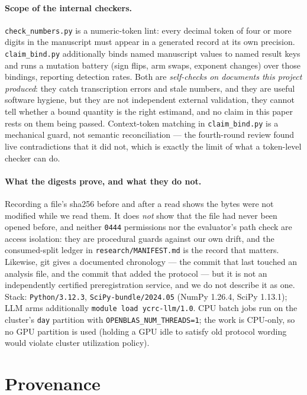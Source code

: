 \documentclass{neurips_2024}
\begin{document}
\paragraph{Scope of the internal checkers.}
\texttt{check\_numbers.py} is a numeric-token lint: every decimal token of four or more digits
in the manuscript must appear in a generated record at its own precision. \texttt{claim\_bind.py}
additionally binds named manuscript values to named result keys and runs a mutation battery
(sign flips, arm swaps, exponent changes) over those bindings, reporting detection rates. Both
are \emph{self-checks on documents this project produced}: they catch transcription errors and
stale numbers, and they are useful software hygiene, but they are not independent external
validation, they cannot tell whether a bound quantity is the right estimand, and no claim in this
paper rests on them being passed. Context-token matching in \texttt{claim\_bind.py} is a
mechanical guard, not semantic reconciliation --- the fourth-round review found live
contradictions that it did not, which is exactly the limit of what a token-level checker can do.

\paragraph{What the digests prove, and what they do not.} Recording a file's sha256 before
and after a read shows the bytes were not modified while we read them. It does \emph{not}
show that the file had never been opened before, and neither \texttt{0444} permissions nor
the evaluator's path check are access isolation: they are procedural guards against our own
drift, and the consumed-split ledger in \texttt{research/MANIFEST.md} is the record that
matters. Likewise, git gives a documented chronology --- the commit that last touched an
analysis file, and the commit that added the protocol --- but it is not an independently
certified preregistration service, and we do not describe it as one.
Stack: \texttt{Python/3.12.3}, \texttt{SciPy-bundle/2024.05} (NumPy 1.26.4, SciPy 1.13.1);
LLM arms additionally \texttt{module load ycrc-llm/1.0}. CPU batch jobs run on the
cluster's \texttt{day} partition with \texttt{OPENBLAS\_NUM\_THREADS=1}; the work is
CPU-only, so no GPU partition is used (holding a GPU idle to satisfy old protocol wording
would violate cluster utilization policy).

\section{Provenance}
\label{app:provenance}
\end{document}
